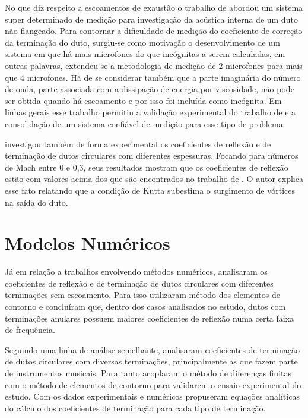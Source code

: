 No que diz respeito a escoamentos de exaustão o trabalho de  abordou um sistema super determinado de medição para investigação da acústica interna de um duto não flangeado. Para contornar a dificuldade de medição do coeficiente de correção da terminação do duto, surgiu-se como motivação o desenvolvimento de um sistema em que há mais microfones do que incógnitas a serem calculadas, em outras palavras, extendeu-se a metodologia de medição de 2 microfones para mais que 4 microfones. Há de se considerar também que a parte imaginária do número de onda, parte associada com a dissipação de energia por viscosidade, não pode ser obtida quando há escoamento e por isso foi incluída como incógnita. Em linhas gerais esse trabalho permitiu a validação experimental do trabalho de  e a consolidação de um sistema confiável de medição para esse tipo de problema.

 investigou também de forma experimental os coeficientes de reflexão e de terminação de dutos circulares com diferentes espessuras. Focando para números de Mach entre 0 e 0,3, seus resultados mostram que os coeficientes de reflexão estão com valores acima dos que são encontrados no trabalho de . O autor explica esse fato relatando que a condição de Kutta subestima o surgimento de vórtices na saída do duto.

\section{Modelos Numéricos}

Já em relação a trabalhos envolvendo métodos numéricos,  analisaram os coeficientes de reflexão e de terminação de dutos circulares com diferentes terminações sem escoamento. Para isso utilizaram método dos elementos de contorno e concluíram que, dentro dos casos analisados no estudo, dutos com terminações anulares possuem maiores coeficientes de reflexão numa certa faixa de frequência.

Seguindo uma linha de análise semelhante,  analisaram coeficientes de terminação de dutos circulares com diversas terminações, principalmente as que fazem parte de instrumentos musicais. Para tanto acoplaram o método de diferenças finitas com o método de elementos de contorno para validarem o ensaio experimental do estudo. Com os dados experimentais e numéricos propuseram equações analíticas do cálculo dos coeficientes de terminação para cada tipo de terminação.

